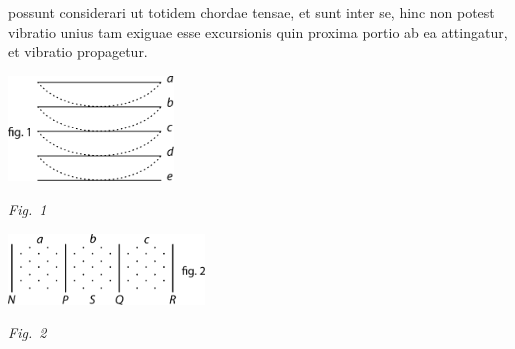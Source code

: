 possunt considerari ut totidem chordae tensae,\protect{}
et 
sunt inter se,\protect{}
hinc non potest vibratio unius\protect{}
tam exiguae esse excursionis\protect{}
quin proxima portio\protect{} ab ea attingatur,
et vibratio propagetur.\protect{}
\pend
\vspace{1.5em}%
  \centerline{\includegraphics[width=0.33\textwidth]{gesamttex/edit_VIII,3/images/LH_37_01_018-019_d1.pdf}}%
  \vspace{0.8em}
  \centerline{\lbrack\textit{Fig.~1}\rbrack}%
  \label{LH_37_01_018v_Fig.1}%
  \protect{}
\newpage
%
  \centerline{\includegraphics[width=0.39\textwidth]{gesamttex/edit_VIII,3/images/LH_37_01_018-019_d2.pdf}}%
  \vspace{1.0em}
  \centerline{\lbrack\textit{Fig.~2}\rbrack}%
  \label{LH_37_01_018v_Fig.2}%
  \protect{}
  \vspace{1.5em}
%
%
